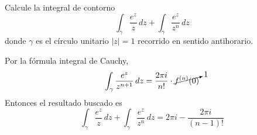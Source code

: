\begin{exercise}
Calcule la integral de contorno
$$\int_\gamma \frac {e^z} z \, dz + \int_\gamma \frac {e^z} {z^n} \, dz$$
donde $\gamma$ es el círculo unitario $|z| = 1$ recorrido en sentido antihorario.
\end{exercise}

\begin{solution}
Por la fórmula integral de Cauchy,
$$\int_\gamma \frac {e^z} {z^{n+1}} \, dz = \frac {2\pi i} {n!} \cdot \cancelto 1 {f^{(n)}(0)}$$
Entonces el resultado buscado es
$$\int_\gamma \frac {e^z} z \, dz + \int_\gamma \frac {e^z} {z^n} \, dz = 2\pi i - \frac {2\pi i} {(n-1)!}$$
\end{solution}
